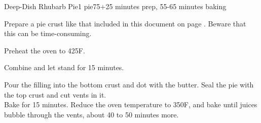 \documentclass[../Cookbook.tex]{subfiles}
\begin{document}
\begin{recipe}{Deep-Dish Rhubarb Pie}{1 pie}{75+25 minutes prep, 55-65 minutes baking}

	Prepare a pie crust like that included in this document on page \pageref{PieCrust}. Beware that this can be time-consuming.

	\newstep
	Preheat the oven to 425\0F.

	Combine and let stand for 15 minutes.

	Pour the filling into the bottom crust and dot with the butter. Seal the pie with the top crust and cut vents in it.\\
	Bake for 15 minutes.
	Reduce the oven temperature to 350\0F, and bake until juices bubble through the vents, about 40 to 50 minutes more.

\end{recipe}
\end{document}
